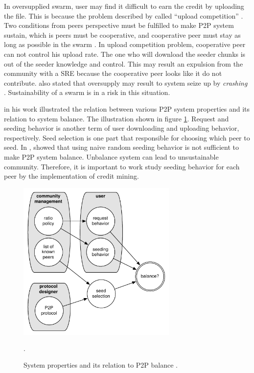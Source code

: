 In oversupplied swarm, user may find it difficult to earn the credit by uploading the file. This is because the problem described by \citeauthor{2011:managesupplydemand:meulpolder} called ``upload competition'' \cite{2011:managesupplydemand:meulpolder}. Two conditions from peers perspective must be fulfilled to make P2P system sustain, which is peers must be cooperative, and cooperative peer must stay as long as possible in the swarm \cite{2011:managesupplydemand:meulpolder}. In upload competition problem, cooperative peer can not control his upload rate. The one who will download the seeder chunks is out of the seeder knowledge and control. This may result an expulsion from the community with a SRE because the cooperative peer looks like it do not contribute. \citeauthor{2010:crashsustain:rahman} also stated that oversupply may result to system seize up by \textit{crashing}  \cite{2010:crashsustain:rahman}. Sustainability of a swarm is in a risk in this situation.

\citeauthor{2011:managesupplydemand:meulpolder} in his work illustrated the relation between various P2P system properties and its relation to system balance. The illustration shown in figure \ref{fig:sysbalance}. Request and seeding behavior is another term of user downloading and uploading behavior, respectively. Seed selection is one part that responsible for choosing which peer to seed. In \cite{2011:managesupplydemand:meulpolder}, \citeauthor{2011:managesupplydemand:meulpolder} showed that using naive random seeding behavior is not sufficient to make P2P system balance. Unbalance system can lead to unsustainable community. Therefore, it is important to work study seeding behavior for each peer by the implementation of credit mining.

\begin{figure}[ht]
	\centering
	\includegraphics[width=0.7\textwidth]{pics/p2psys_balance.pdf}
	\caption{System properties and its relation to P2P balance \cite{2011:managesupplydemand:meulpolder}.}.
	\label{fig:sysbalance}
\end{figure}


